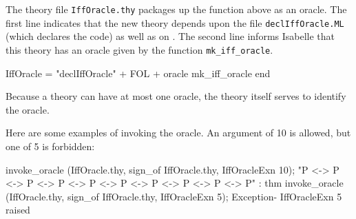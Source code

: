 The theory file {\tt IffOracle.thy} packages up the function above as an
oracle.  The first line indicates that the new theory depends upon the file
{\tt declIffOracle.ML} (which declares the {\ML} code) as well as on \FOL.
The second line informs Isabelle that this theory has an oracle given by the
function {\tt mk_iff_oracle}.
\begin{ttbox}
IffOracle = "declIffOracle" + FOL +
oracle mk_iff_oracle
end
\end{ttbox}
Because a theory can have at most one oracle, the theory itself serves to
identify the oracle.

Here are some examples of invoking the oracle.  An argument of 10 is allowed,
but one of 5 is forbidden:
\begin{ttbox}
invoke_oracle (IffOracle.thy, sign_of IffOracle.thy, IffOracleExn 10);
{\out  "P <-> P <-> P <-> P <-> P <-> P <-> P <-> P <-> P <-> P" : thm}
invoke_oracle (IffOracle.thy, sign_of IffOracle.thy, IffOracleExn 5); 
{\out Exception- IffOracleExn 5 raised}
\end{ttbox}

